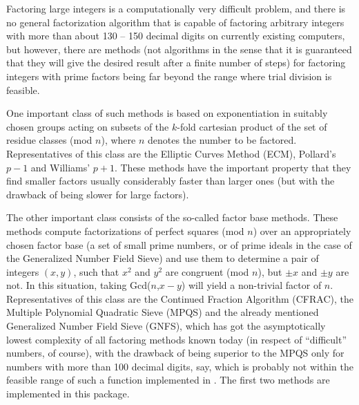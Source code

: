

Factoring large integers is a computationally very difficult problem,
and there is no general factorization algorithm that is capable of
factoring arbitrary integers with more than about 130 -- 150 decimal
digits on currently existing computers, but however, there are
methods (not algorithms in the sense that it is guaranteed that
they will give the desired result after a finite number of steps) for
factoring integers with prime factors being far beyond the range where
trial division is feasible.

One important class of such methods is based on exponentiation in
suitably chosen groups acting on subsets of the $k$-fold cartesian
product of the set of residue classes (mod $n$), where $n$ denotes the
number to be factored.
Representatives of this class are the Elliptic Curves Method (ECM),
Pollard's $p-1$ and Williams' $p+1$.
These methods have the important property that they find smaller
factors usually considerably faster than larger ones
(but with the drawback of being slower for large factors).

The other important class consists of the so-called factor base methods.
These methods compute factorizations of perfect squares (mod $n$) over
an appropriately chosen factor base (a set of small prime numbers, or
of
prime ideals in the case of the
Generalized Number Field Sieve)
and use them to determine a pair of integers $(x,y)$, such that
$x^2$ and $y^2$ are congruent (mod $n$), but $\pm x$ and $\pm y$ are not.
In this situation, taking Gcd($n$,$x-y$) will yield a non-trivial
factor of $n$.
Representatives of this class are the Continued Fraction Algorithm
(CFRAC), the Multiple Polynomial Quadratic Sieve (MPQS) and the
already mentioned Generalized Number Field Sieve (GNFS), which has got
the asymptotically lowest complexity of all factoring methods known today
(in respect of ``difficult'' numbers, of course), with the drawback
of being superior to the MPQS only for numbers with more than 100
decimal digits, say, which is probably not within the feasible range
of such a function implemented in {\GAP}.
The first two methods are implemented in this package.

